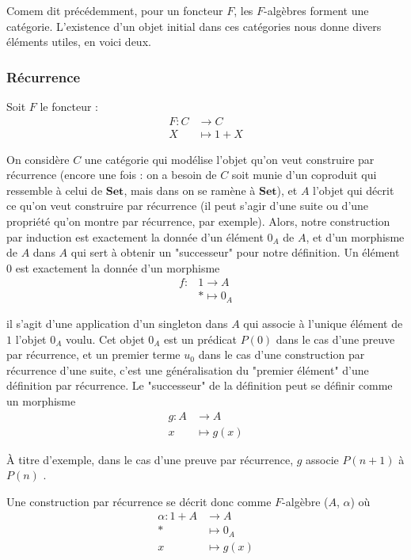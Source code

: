 \documentclass{article}
\begin{document}
Comem dit précédemment, pour un foncteur $F$, les $F$-algèbres forment une catégorie. L'existence d'un objet initial dans ces catégories nous donne divers éléments utiles, en voici deux. 

\subsubsection{Récurrence}

Soit $F$ le foncteur : 
\begin{align*}
    F : C & \rightarrow C \\ 
    X & \mapsto 1 + X
\end{align*}

On considère $C$ une catégorie qui modélise l'objet qu'on veut construire par récurrence (encore une fois : on a besoin de $C$ soit munie d'un coproduit qui ressemble à celui de $\mathbf{Set}$, mais dans on se ramène à $\mathbf{Set}$), et $A$ l'objet qui décrit ce qu'on veut construire par récurrence (il peut s'agir d'une suite ou d'une propriété qu'on montre par récurrence, par exemple). Alors, notre construction par induction est exactement la donnée d'un élément $0_A$ de $A$, et d'un morphisme de $A$ dans $A$ qui sert à obtenir un "successeur" pour notre définition. Un élément $0$ est exactement la donnée d'un morphisme  
\begin{align*}
f : & 1  \rightarrow A \\
    & * \mapsto 0_A
\end{align*}

il s'agit d'une application d'un singleton dans $A$ qui associe à l'unique élément de $1$ l'objet $0_A$ voulu. Cet objet $0_A$ est un prédicat $P(0)$ dans le cas d'une preuve par récurrence, et un premier terme $u_0$ dans le cas d'une construction par récurrence d'une suite, c'est une généralisation du "premier élément" d'une définition par récurrence. Le "successeur" de la définition peut se définir comme un morphisme 
\begin{align*}
    g : A &  \rightarrow A \\ 
        x & \mapsto g(x)
\end{align*}

À titre d'exemple, dans le cas d'une preuve par récurrence, $g$ associe $P(n+1)$ à $P(n)$ .
    
     Une construction par récurrence se décrit donc comme $F$-algèbre ($A$, $\alpha$) où
\begin{align*}
    \alpha : 1 + A & \rightarrow A \\ 
    * & \mapsto 0_A \\ 
    x & \mapsto g(x)
\end{align*}
\end{document}
